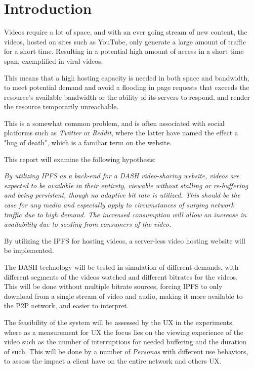 \chapter{Introduction}
\label{cha:introduction}
Videos require a lot of space, and with an ever going stream of new content, the videos, hosted on sites such as YouTube, only generate a large amount of traffic for a short time. Resulting in a potential high amount of access in a short time span, exemplified in viral videos. 

This means that a high hosting capacity is needed in both space and bandwidth, to meet potential demand and avoid a flooding in page requests that exceeds the resource's available bandwidth or the ability of its servers to respond, and render the resource temporarily unreachable.

This is a somewhat common problem, and is often associated with social platforms such as \textit{Twitter} or \textit{Reddit}, where the latter have named the effect a "hug of death", which is a familiar term on the website.

\vspace{0.8cm}
\noindent This report will examine the following hypothesis:

\begin{displayquote}
    \textit{
        By utilizing \ac{IPFS} as a back-end for a \ac{DASH} video-sharing website, videos are expected to be available in their entirety, viewable without stalling or re-buffering and being persistent, though no adaptive bit rate is utilized.
        This should be the case for any media and especially apply to circumstances of surging network traffic due to high demand. The increased consumption will allow an increase in availability due to seeding from consumers of the video.
    }
\end{displayquote}
\vspace{0.5cm}

By utilizing the \ac{IPFS} for hosting videos, a server-less video hosting website will be implemented.

The \ac{DASH} technology will be tested in simulation of different demands, with different segments of the videos watched and different bitrates for the videos. This will be done without multiple bitrate sources, forcing IPFS to only download from a single stream of video and audio, making it more available to the \ac{P2P} network, and easier to interpret.

The feasibility of the system will be assessed by the \ac{UX} in the experiments, where as a measurement for \ac{UX} the focus lies on the viewing experience of the video such as the number of interruptions for needed buffering and the duration of such. This will be done by a number of \emph{Personas} with different use behaviors, to assess the impact a client have on the entire network and others \ac{UX}.


